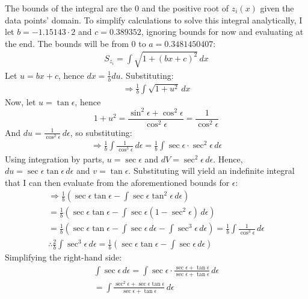 \documentclass[12pt]{article}
\numberwithin{equation}{section}
\begin{document}
\FloatBarrier
\noindent The bounds of the integral are the 0 and the positive root of $z_i(x)$ given the data points' domain. To simplify calculations to solve this integral analytically, I let $b = -1.15143 \cdot 2$ and $c = 0.389352$, ignoring bounds for now and evaluating at the end. The bounds will be  from 0 to $a = 0.3481450407$:
\begin{gather*}
    S_{z_i} = \int \sqrt{1 + (bx+c)^2} \, dx
\end{gather*}
Let $u = bx+c$, hence $dx = \frac{1}{b} du$. Substituting:
\begin{gather*}
   \Rightarrow \frac{1}{b}\int \sqrt{1 + u^2} \, dx
\end{gather*}
Now, let $u = \tan{\epsilon}$, hence 
$$1 + u^2 = \frac{\sin^2{\epsilon} + \cos^2{\epsilon}}{\cos^2{\epsilon}} = \frac{1}{\cos^2{\epsilon}}$$
And $du = \frac{1}{\cos^2{\epsilon}} \, d\epsilon$, so substituting:
\begin{gather*}
    \Rightarrow \frac{1}{b} \int \frac{1}{\cos^3{\epsilon}} \, d\epsilon = \frac{1}{b} \int \sec{\epsilon} \cdot \sec^2{\epsilon} \, d\epsilon
\end{gather*}
Using integration by parts, $u = \sec{\epsilon}$ and $dV = \sec^2{\epsilon} \, d\epsilon$. Hence, $du = \sec{\epsilon} \tan{\epsilon} \, d\epsilon$ and $v = \tan{\epsilon}$. Substituting will yield an indefinite integral that I can then evaluate from the aforementioned bounds for $\epsilon$:
\begin{gather*}
    \Rightarrow \frac{1}{b} \left( \sec{\epsilon} \tan{\epsilon} - \int \sec{\epsilon} \tan^2{\epsilon} \, d\epsilon \right)\\
    = \frac{1}{b} \left( \sec{\epsilon} \tan{\epsilon} - \int \sec{\epsilon} (1-\sec^2{\epsilon}) \, d\epsilon \right)\\
    = \frac{1}{b} \left( \sec{\epsilon} \tan{\epsilon} - \int \sec{\epsilon} \, d\epsilon - \int \sec^3{\epsilon} \,d \epsilon \right) = \frac{1}{b} \int \frac{1}{\cos^3{\epsilon}} \, d\epsilon \\
    \therefore \frac{2}{b} \int \sec^3{\epsilon} \, d\epsilon = \frac{1}{b} \left( \sec{\epsilon} \tan{\epsilon} - \int \sec{\epsilon} \, d\epsilon \right)
\end{gather*}
Simplifying the right-hand side:
\begin{gather*}
    \int \sec{\epsilon} \, d\epsilon = \int \sec{\epsilon} \cdot \frac{\sec{\epsilon} + \tan{\epsilon}}{\sec{\epsilon} + \tan{\epsilon}}  \, d\epsilon \\
    = \int \frac{\sec^2{\epsilon} + \sec{\epsilon}\tan{\epsilon}}{\sec{\epsilon} + \tan{\epsilon}} \, d\epsilon
\end{gather*}
\end{document}

